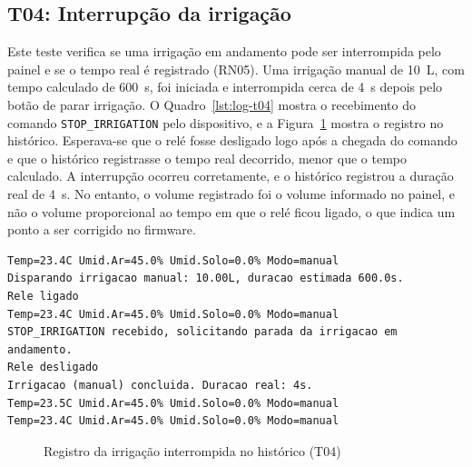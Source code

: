 \subsection{T04: Interrupção da irrigação}

Este teste verifica se uma irrigação em andamento pode ser interrompida pelo painel e se o tempo real é registrado (RN05). Uma irrigação manual de 10~L, com tempo calculado de 600~s, foi iniciada e interrompida cerca de 4~s depois pelo botão de parar irrigação. O Quadro~\ref{lst:log-t04} mostra o recebimento do comando \texttt{STOP\_IRRIGATION} pelo dispositivo, e a Figura~\ref{fig:t04-historico} mostra o registro no histórico. Esperava-se que o relé fosse desligado logo após a chegada do comando e que o histórico registrasse o tempo real decorrido, menor que o tempo calculado. A interrupção ocorreu corretamente, e o histórico registrou a duração real de 4~s. No entanto, o volume registrado foi o volume informado no painel, e não o volume proporcional ao tempo em que o relé ficou ligado, o que indica um ponto a ser corrigido no firmware.

\vspace{0.6\baselineskip}
\noindent\begin{minipage}{\linewidth}
\begin{lstlisting}[language={}, caption={Log do monitor serial na interrupção da irrigação (T04)}, label={lst:log-t04}]
Temp=23.4C Umid.Ar=45.0% Umid.Solo=0.0% Modo=manual
Disparando irrigacao manual: 10.00L, duracao estimada 600.0s.
Rele ligado
Temp=23.4C Umid.Ar=45.0% Umid.Solo=0.0% Modo=manual
STOP_IRRIGATION recebido, solicitando parada da irrigacao em andamento.
Rele desligado
Irrigacao (manual) concluida. Duracao real: 4s.
Temp=23.5C Umid.Ar=45.0% Umid.Solo=0.0% Modo=manual
Temp=23.4C Umid.Ar=45.0% Umid.Solo=0.0% Modo=manual
\end{lstlisting}
\vspace{-0.5\baselineskip}
\end{minipage}
\medskip

\begin{figure}[htbp]
  \centering
  \caption{Registro da irrigação interrompida no histórico (T04)}
  \label{fig:t04-historico}
\end{figure}

